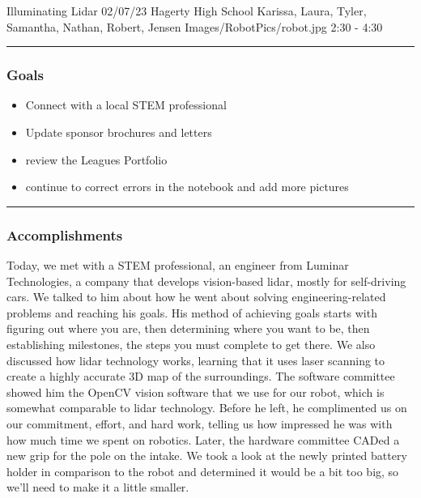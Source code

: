 \insertmeeting 
	{Illuminating Lidar} 
	{02/07/23} 
	{Hagerty High School}
	{Karissa, Laura, Tyler,  Samantha, Nathan, Robert, Jensen}
	{Images/RobotPics/robot.jpg}
	{2:30 - 4:30}
	
\noindent\hfil\rule{\textwidth}{.4pt}\hfil
\subsubsection*{Goals}
\begin{itemize}
    \item Connect with a local STEM professional
    \item Update sponsor brochures and letters 
    \item review the Leagues Portfolio
    \item continue to correct errors in the notebook and add more pictures

\end{itemize} 

\noindent\hfil\rule{\textwidth}{.4pt}\hfil

\subsubsection*{Accomplishments}
Today, we met with a STEM professional, an engineer from Luminar Technologies, a company that develops vision-based lidar, mostly for self-driving cars. We talked to him about how he went about solving engineering-related problems and reaching his goals. His method of achieving goals starts with figuring out where you are, then determining where you want to be, then establishing milestones, the steps you must complete to get there. We also discussed how lidar technology works, learning that it uses laser scanning to create a highly accurate 3D map of the surroundings. The software committee showed him the OpenCV vision software that we use for our robot, which is somewhat comparable to lidar technology. Before he left, he complimented us on our commitment, effort, and hard work, telling us how impressed he was with how much time we spent on robotics. Later, the hardware committee CADed a new grip for the pole on the intake. We took a look at the newly printed battery holder in comparison to the robot and determined it would be a bit too big, so we’ll need to make it a little smaller. 


